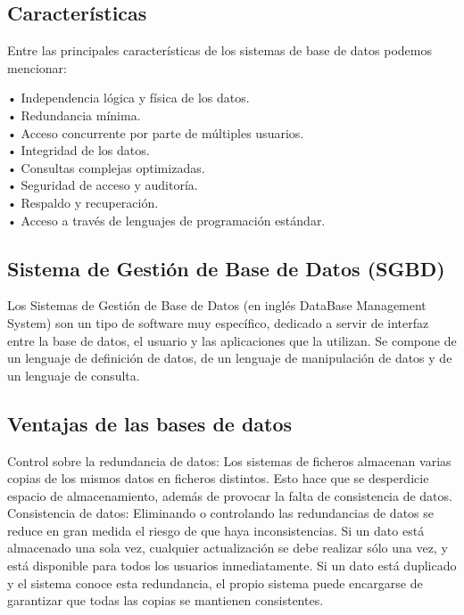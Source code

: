 \subsection{Características}
Entre las principales características de los sistemas de base de datos podemos mencionar:

• Independencia lógica y física de los datos.\\
• Redundancia mínima.\\
• Acceso concurrente por parte de múltiples usuarios.\\
• Integridad de los datos.\\
• Consultas complejas optimizadas.\\
• Seguridad de acceso y auditoría.\\
• Respaldo y recuperación.\\
• Acceso a través de lenguajes de programación estándar.

\subsection{Sistema de Gestión de Base de Datos (SGBD)}
Los Sistemas de Gestión de Base de Datos (en inglés DataBase Management System) son un tipo de software muy específico, dedicado a servir de interfaz entre la base de datos, el usuario y las aplicaciones que la utilizan. Se compone de un lenguaje de definición de datos, de un lenguaje de manipulación de datos y de un lenguaje de consulta.

\subsection{Ventajas de las bases de datos}
Control sobre la redundancia de datos:
Los sistemas de ficheros almacenan varias copias de los mismos datos en ficheros distintos. Esto hace que se desperdicie espacio de almacenamiento, además de provocar la falta de consistencia de datos.\\

Consistencia de datos:
Eliminando o controlando las redundancias de datos se reduce en gran medida el riesgo de que haya inconsistencias. Si un dato está almacenado una sola vez, cualquier actualización se debe realizar sólo una vez, y está disponible para todos los usuarios inmediatamente. Si un dato está duplicado y el sistema conoce esta redundancia, el propio sistema puede encargarse de garantizar que todas las copias se mantienen consistentes.\\

